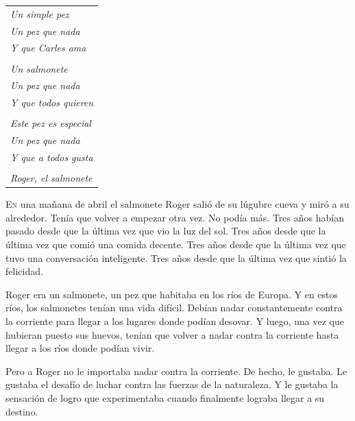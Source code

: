 \documentclass[letterpaper,11pt]{report}
\begin{document}
\vspace*{\fill}
\pagebreak



\begin{center}
\begin{tabular}{l}
\textit{Un simple pez}\\
\textit{Un pez que nada}\\
\textit{Y que Carles ama}\\
\\
\textit{Un salmonete}\\
\textit{Un pez que nada}\\
\textit{Y que todos quieren}\\
\\
\textit{Este pez es especial}\\
\textit{Un pez que nada}\\
\textit{Y que a todos gusta}\\
\\
\textit{Roger, el salmonete}
\end{tabular}
\end{center}

\vspace*{\fill}

\lettrine{E}{n} una mañana de abril el salmonete Roger salió de su lúgubre cueva y miró a su alrededor. Tenía que volver a empezar otra vez. No podía más. Tres años habían pasado desde que la última vez que vio la luz del sol. Tres años desde que la última vez que comió una comida decente. Tres años desde que la última vez que tuvo una conversación inteligente. Tres años desde que la última vez que sintió la felicidad.

Roger era un salmonete, un pez que habitaba en los ríos de Europa. Y en estos ríos, los salmonetes tenían una vida difícil. Debían nadar constantemente contra la corriente para llegar a los lugares donde podían desovar. Y luego, una vez que hubieran puesto sus huevos, tenían que volver a nadar contra la corriente hasta llegar a los ríos donde podían vivir.

Pero a Roger no le importaba nadar contra la corriente. De hecho, le gustaba. Le gustaba el desafío de luchar contra las fuerzas de la naturaleza. Y le gustaba la sensación de logro que experimentaba cuando finalmente lograba llegar a su destino.
\end{document}
